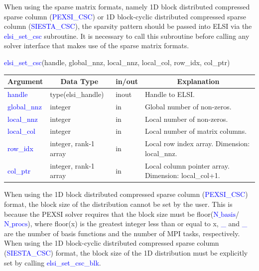\documentclass{report}
\begin{document}
\bigskip
When using the sparse matrix formats, namely 1D block distributed compressed sparse column (\textcolor{blue}{PEXSI\_CSC}) or 1D block-cyclic distributed compressed sparse column (\textcolor{blue}{SIESTA\_CSC}), the sparsity pattern should be passed into ELSI via the \textcolor{blue}{elsi\_set\_csc} subroutine.  It is necessary to call this subroutine before calling any solver interface that makes use of the sparse matrix formats.\\

\newpage
\begin{labeling}{\hspace{6cm}}
\item [\hspace{0.3cm} \textcolor{blue}{elsi\_set\_csc}(handle, global\_nnz, local\_nnz, local\_col, row\_idx, col\_ptr)]
\end{labeling}

\begin{tabular}[]{|p{30mm}|p{35mm}|p{15mm}|p{85mm}|}
\hline
\multicolumn{1}{|c|}{\textbf{Argument}} & \multicolumn{1}{c|}{\textbf{Data Type}} & \multicolumn{1}{c|}{\textbf{in/out}} & \multicolumn{1}{c|}{\textbf{Explanation}}\\
\hline
\textcolor{blue}{handle}      & type(elsi\_handle)    & inout & Handle to ELSI.\\
\hline
\textcolor{blue}{global\_nnz} & integer               & in    & Global number of non-zeros.\\
\hline
\textcolor{blue}{local\_nnz}  & integer               & in    & Local number of non-zeros.\\
\hline
\textcolor{blue}{local\_col}  & integer               & in    & Local number of matrix columns.\\
\hline
\textcolor{blue}{row\_idx}    & integer, rank-1 array & in    & Local row index array.  Dimension: local\_nnz.\\
\hline
\textcolor{blue}{col\_ptr}    & integer, rank-1 array & in    & Local column pointer array.  Dimension: local\_col+1.\\
\hline
\end{tabular}

\bigskip
When using the 1D block distributed compressed sparse column (\textcolor{blue}{PEXSI\_CSC}) format, the block size of the distribution cannot be set by the user.  This is because the PEXSI solver requires that the block size must be floor(\textcolor{blue}{$\text{N}\_\text{basis}$}/\textcolor{blue}{$\text{N}\_\text{procs}$}), where floor(x) is the greatest integer less than or equal to x, \textcolor{blue}{\_} and \textcolor{blue}{\_} are the number of basis functions and the number of MPI tasks, respectively.  When using the 1D block-cyclic distributed compressed sparse column (\textcolor{blue}{SIESTA\_CSC}) format, the block size of the 1D distribution must be explicitly set by calling \textcolor{blue}{elsi\_set\_csc\_blk}.\\
\end{document}
